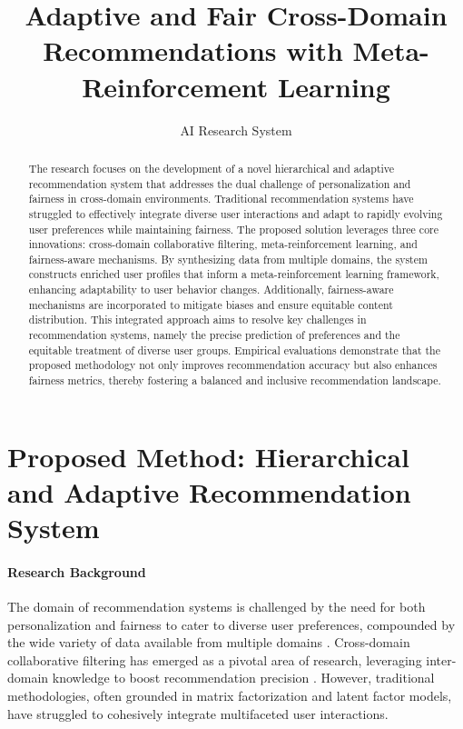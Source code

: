 \documentclass{article} %
\title{Adaptive and Fair Cross-Domain Recommendations with Meta-Reinforcement Learning}
\author{AI Research System}
\begin{document}
\maketitle

\begin{abstract}
The research focuses on the development of a novel hierarchical and adaptive recommendation system that addresses the dual challenge of personalization and fairness in cross-domain environments. Traditional recommendation systems have struggled to effectively integrate diverse user interactions and adapt to rapidly evolving user preferences while maintaining fairness. The proposed solution leverages three core innovations: cross-domain collaborative filtering, meta-reinforcement learning, and fairness-aware mechanisms. By synthesizing data from multiple domains, the system constructs enriched user profiles that inform a meta-reinforcement learning framework, enhancing adaptability to user behavior changes. Additionally, fairness-aware mechanisms are incorporated to mitigate biases and ensure equitable content distribution. This integrated approach aims to resolve key challenges in recommendation systems, namely the precise prediction of preferences and the equitable treatment of diverse user groups. Empirical evaluations demonstrate that the proposed methodology not only improves recommendation accuracy but also enhances fairness metrics, thereby fostering a balanced and inclusive recommendation landscape.
\end{abstract}


\section{Proposed Method: Hierarchical and Adaptive Recommendation System}

\paragraph{Research Background}
The domain of recommendation systems is challenged by the need for both personalization and fairness to cater to diverse user preferences, compounded by the wide variety of data available from multiple domains \citep{tang2012cross}. Cross-domain collaborative filtering has emerged as a pivotal area of research, leveraging inter-domain knowledge to boost recommendation precision \citep{fernandez2012cross, sang2015effective}. However, traditional methodologies, often grounded in matrix factorization and latent factor models, have struggled to cohesively integrate multifaceted user interactions.
\end{document}
